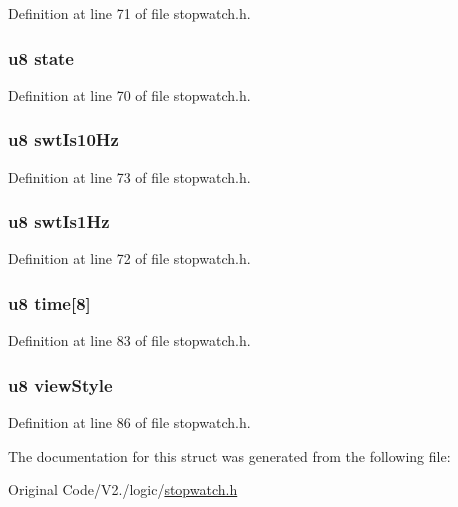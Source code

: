 \-Definition at line 71 of file stopwatch.\-h.

\hypertarget{structstopwatch_ad0bc4e4e6e6ffc52d9079b73afd73887}{
\subsubsection[{state}]{\setlength{\rightskip}{0pt plus 5cm}u8 {\bf state}}}\label{structstopwatch_ad0bc4e4e6e6ffc52d9079b73afd73887}


\-Definition at line 70 of file stopwatch.\-h.

\hypertarget{structstopwatch_a59a4bb7692742b89191e778942eeccba}{
\subsubsection[{swt\-Is10\-Hz}]{\setlength{\rightskip}{0pt plus 5cm}u8 {\bf swt\-Is10\-Hz}}}\label{structstopwatch_a59a4bb7692742b89191e778942eeccba}


\-Definition at line 73 of file stopwatch.\-h.

\hypertarget{structstopwatch_a26bbaf3a098503cb253a15db2ea626c3}{
\subsubsection[{swt\-Is1\-Hz}]{\setlength{\rightskip}{0pt plus 5cm}u8 {\bf swt\-Is1\-Hz}}}\label{structstopwatch_a26bbaf3a098503cb253a15db2ea626c3}


\-Definition at line 72 of file stopwatch.\-h.

\hypertarget{structstopwatch_a2789a512c999ccb6743da309f32eec05}{
\subsubsection[{time}]{\setlength{\rightskip}{0pt plus 5cm}u8 {\bf time}\mbox{[}8\mbox{]}}}\label{structstopwatch_a2789a512c999ccb6743da309f32eec05}


\-Definition at line 83 of file stopwatch.\-h.

\hypertarget{structstopwatch_a1c3b9f9d799364d05f9abf6892baddef}{
\subsubsection[{view\-Style}]{\setlength{\rightskip}{0pt plus 5cm}u8 {\bf view\-Style}}}\label{structstopwatch_a1c3b9f9d799364d05f9abf6892baddef}


\-Definition at line 86 of file stopwatch.\-h.



\-The documentation for this struct was generated from the following file\-:\begin{DoxyCompactItemize}
\item 
\-Original Code/\-V2./logic/\hyperlink{stopwatch_8h}{stopwatch.\-h}\end{DoxyCompactItemize}
